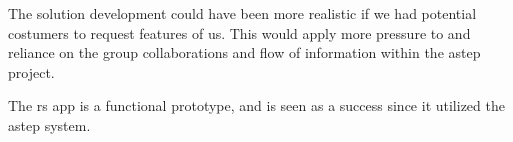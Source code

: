 The solution development could have been more realistic if we had potential costumers to request features of us.
This would apply more pressure to and reliance on the group collaborations and flow of information within the \gls{astep} project.

The \gls{rs} app is a functional prototype, and is seen as a success since it utilized the \gls{astep} system.


